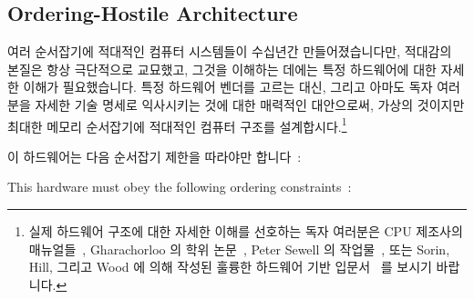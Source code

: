 \fi

\subsection{Ordering-Hostile Architecture}
\label{sec:app:whymb:Ordering-Hostile Architecture}

여러 순서잡기에 적대적인 컴퓨터 시스템들이 수십년간 만들어졌습니다만, 적대감의
본질은 항상 극단적으로 교묘했고, 그것을 이해하는 데에는 특정 하드웨어에 대한
자세한 이해가 필요했습니다.
특정 하드웨어 벤더를 고르는 대신, 그리고 아마도 독자 여러분을 자세한 기술
명세로 익사시키는 것에 대한 매력적인 대안으로써, 가상의 것이지만 최대한 메모리
순서잡기에 적대적인 컴퓨터 구조를 설계합시다.\footnote{
	실제 하드웨어 구조에 대한 자세한 이해를 선호하는 독자 여러분은 CPU
	제조사의 매뉴얼들~\cite{ALPHA95,AMDOpteron02,IntelItanium02v2,PowerPC94,MichaelLyons05a,SPARC94,IntelXeonV3-96a,IntelXeonV2b-96a,IBMzSeries04a},
	Gharachorloo 의 학위 논문~\cite{Gharachorloo95},
	Peter Sewell 의 작업물~\cite{PeterSewell2021weakmemory}, 또는
	Sorin, Hill, 그리고 Wood 에 의해 작성된 훌륭한 하드웨어 기반
	입문서~\cite{DanielJSorin2011MemModel} 를 보시기 바랍니다.}

\iffalse

A number of ordering-hostile computer systems have been produced over
the decades,
but the nature of the hostility has always been extremely subtle,
and understanding it has required detailed knowledge of the specific
hardware.
Rather than picking on a specific hardware vendor, and as a presumably
attractive alternative to dragging the reader through detailed
technical specifications, let us instead design a mythical but maximally
memory-ordering-hostile computer architecture.\footnote{
	Readers preferring a detailed look at real hardware
	architectures are encouraged to consult CPU vendors'
	manuals~\cite{ALPHA95,AMDOpteron02,IntelItanium02v2,PowerPC94,MichaelLyons05a,SPARC94,IntelXeonV3-96a,IntelXeonV2b-96a,IBMzSeries04a},
	Gharachorloo's dissertation~\cite{Gharachorloo95},
	Peter Sewell's work~\cite{PeterSewell2021weakmemory}, or
	the excellent hardware-oriented primer by
	Sorin, Hill, and Wood~\cite{DanielJSorin2011MemModel}.}

\fi

이 하드웨어는 다음 순서잡기 제한을 따라야만
합니다~\cite{PaulMcKenney2005i,PaulMcKenney2005j}:

\iffalse

This hardware must obey the following ordering
constraints~\cite{PaulMcKenney2005i,PaulMcKenney2005j}:

